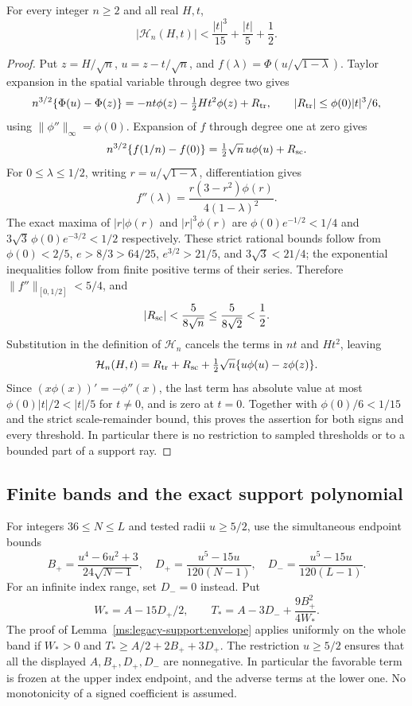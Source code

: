 \begin{lemma}\label{ms:legacy-support:far-gaussian}
For every integer $n\ge2$ and all real $H,t$,
\[
 |\mathcal H_n(H,t)|<\frac{|t|^3}{15}+\frac{|t|}{5}+\frac12.
\]
\end{lemma}
\begin{proof}
Put $z=H/\sqrt n$, $u=z-t/\sqrt n$, and
$f(\lambda)=\Phi(u/\sqrt{1-\lambda})$. Taylor expansion in the spatial
variable through degree two gives
\[
 n^{3/2}\{\Phi(u)-\Phi(z)\}
 =-nt\phi(z)-\tfrac12Ht^2\phi(z)+R_{\rm tr},\qquad
 |R_{\rm tr}|\le\phi(0)|t|^3/6,
\]
using $\|\phi''\|_\infty=\phi(0)$. Expansion of $f$ through degree
one at zero gives
\[
 n^{3/2}\{f(1/n)-f(0)\}
 =\tfrac12\sqrt n\,u\phi(u)+R_{\rm sc}.
\]
For $0\le\lambda\le1/2$, writing
$r=u/\sqrt{1-\lambda}$, differentiation gives
\[
 f''(\lambda)=\frac{r(3-r^2)\phi(r)}{4(1-\lambda)^2}.
\]
The exact maxima of $|r|\phi(r)$ and $|r|^3\phi(r)$ are
$\phi(0)e^{-1/2}<1/4$ and
$3\sqrt3\,\phi(0)e^{-3/2}<1/2$ respectively. These strict rational
bounds follow from $\phi(0)<2/5$, $e>8/3>64/25$,
$e^{3/2}>21/5$, and $3\sqrt3<21/4$; the exponential inequalities follow
from finite positive terms of their series. Therefore
$\|f''\|_{[0,1/2]}<5/4$, and
\[
 |R_{\rm sc}|<\frac5{8\sqrt n}\le\frac5{8\sqrt2}<\frac12.
\]
Substitution in the definition of $\mathcal H_n$ cancels the terms in
$nt$ and $Ht^2$, leaving
\[
 \mathcal H_n(H,t)=R_{\rm tr}+R_{\rm sc}
       +\tfrac12\sqrt n\{u\phi(u)-z\phi(z)\}.
\]
Since $(x\phi(x))'=-\phi''(x)$, the last term has absolute value at
most $\phi(0)|t|/2<|t|/5$ for $t\ne0$, and is zero at $t=0$.
Together with $\phi(0)/6<1/15$ and the strict scale-remainder bound,
this proves the assertion for both signs and every threshold. In
particular there is no restriction to sampled thresholds or to a
bounded part of a support ray.
\end{proof}

\subsection{Finite bands and the exact support polynomial}\label{ms:legacy-support:polynomial}
For integers $36\le N\le L$ and tested radii $u\ge5/2$, use the
simultaneous endpoint bounds
\[
 B_+=\frac{u^4-6u^2+3}{24\sqrt{N-1}},\quad
 D_+=\frac{u^5-15u}{120(N-1)},\quad
 D_-=\frac{u^5-15u}{120(L-1)}.
\]
For an infinite index range, set $D_-=0$ instead. Put
\[
 W_*=A-15D_+/2,\qquad
 T_*=A-3D_-+\frac{9B_+^2}{4W_*}.
\]
The proof of Lemma~\ref{ms:legacy-support:envelope} applies uniformly on the whole band
if $W_*>0$ and $T_*\ge A/2+2B_++3D_+$. The restriction $u\ge5/2$
ensures that all the displayed $A,B_+,D_+,D_-$ are nonnegative. In particular the favorable
term is frozen at the upper index endpoint, and the adverse terms at
the lower one. No monotonicity of a signed coefficient is assumed.

